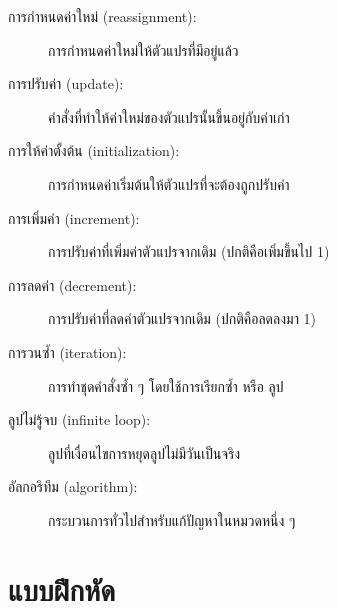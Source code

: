 \begin{description}

\item[การกำหนดค่าใหม่ (reassignment):] การกำหนดค่าใหม่ให้ตัวแปรที่มีอยู่แล้ว

\item[การปรับค่า (update):] คำสั่งที่ทำให้ค่าใหม่ของตัวแปรนั้นขึ้นอยู่กับค่าเก่า

\item[การให้ค่าตั้งต้น (initialization):] การกำหนดค่าเริ่มต้นให้ตัวแปรที่จะต้องถูกปรับค่า

\item[การเพิ่มค่า (increment):] การปรับค่าที่เพิ่มค่าตัวแปรจากเดิม (ปกติคือเพิ่มขึ้นไป 1)

\item[การลดค่า (decrement):] การปรับค่าที่ลดค่าตัวแปรจากเดิม (ปกติคือลดลงมา 1)

\item[การวนซ้ำ (iteration):] การทำชุดคำสั่งซ้ำ ๆ โดยใช้การเรียกซ้ำ หรือ ลูป

\item[ลูปไม่รู้จบ (infinite loop):] ลูปที่เงื่อนไขการหยุดลูปไม่มีวันเป็นจริง

\item[อัลกอริทึม (algorithm):]  กระบวนการทั่วไปสำหรับแก้ปัญหาในหมวดหนึ่ง ๆ

\end{description}


\section{แบบฝึกหัด}

